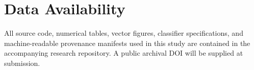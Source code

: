 \documentclass[aps,pre,reprint,amsmath,amssymb,longbibliography,floatfix]{revtex4-2}
\begin{document}
\section*{Data Availability}

All source code, numerical tables, vector figures, classifier specifications,
and machine-readable provenance manifests used in this study are contained in
the accompanying research repository. A public archival DOI will be supplied
at submission.


\end{document}
